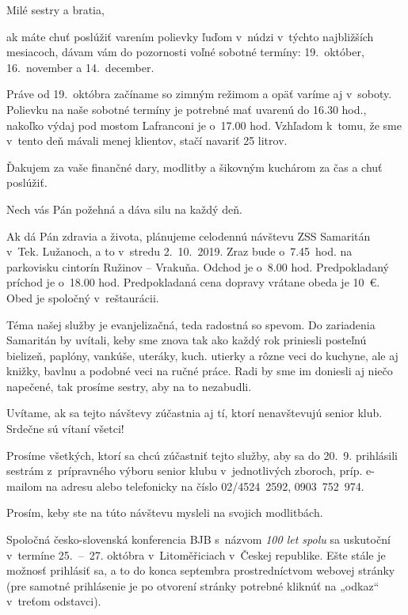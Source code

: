 Milé sestry a bratia,

ak máte chuť poslúžiť varením polievky ľuďom v~núdzi v~týchto najbližších mesiacoch, dávam vám do pozornosti voľné sobotné termíny: 19.~október, 16.~november a 14.~december.

Práve od 19.~októbra začíname so zimným režimom a opäť varíme aj v~soboty. Polievku na naše sobotné termíny je potrebné mať uvarenú do 16.30 hod., nakoľko výdaj pod mostom Lafranconi je o~17.00 hod. Vzhľadom k~tomu, že sme v~tento deň mávali menej klientov, stačí navariť 25 litrov.

Ďakujem za vaše finančné dary, modlitby a šikovným kuchárom za čas a chuť poslúžiť.

Nech vás Pán požehná a dáva silu na každý deň.

\vfill\break


Ak dá Pán zdravia a života, plánujeme celodennú návštevu ZSS Samaritán v~Tek. Lužanoch, a to v~stredu 2.~10.~2019. Zraz bude o~7.45~hod. na parkovisku cintorín Ružinov -- Vrakuňa. Odchod je o~8.00 hod. Predpokladaný príchod je o~18.00 hod. Predpokladaná cena dopravy vrátane obeda je 10~€. Obed je spoločný v~reštaurácii.

Téma našej služby je evanjelizačná, teda radostná so spevom. Do zariadenia Samaritán by uvítali, keby sme znova tak ako každý rok priniesli posteľnú bielizeň, paplóny, vankúše, uteráky, kuch. utierky a rôzne veci do kuchyne, ale aj knižky, bavlnu a podobné veci na ručné práce. Radi by sme im doniesli aj niečo napečené, tak prosíme sestry, aby na to nezabudli.

Uvítame, ak sa tejto návštevy zúčastnia aj tí, ktorí nenavštevujú senior klub. Srdečne sú vítaní všetci!

Prosíme všetkých, ktorí sa chcú zúčastniť tejto služby, aby sa do 20.~9. prihlásili sestrám z~prípravného výboru senior klubu v~jednotlivých zboroch, príp. e-mailom na adresu  alebo telefonicky na číslo 02/4524~2592, 0903~752~974.

Prosím, keby ste na túto návštevu mysleli na svojich modlitbách.



Spoločná česko-slovenská konferencia BJB s~názvom {\it 100 let spolu} sa uskutoční v~termíne 25.~--~27. októbra v~Litoměřiciach v~Českej republike.
Ešte stále je možnosť prihlásiť sa, a to do konca septembra prostredníctvom webovej stránky \hbox{} (pre samotné prihlásenie je po otvorení stránky potrebné kliknúť na „odkaz“ v~treťom odstavci).


